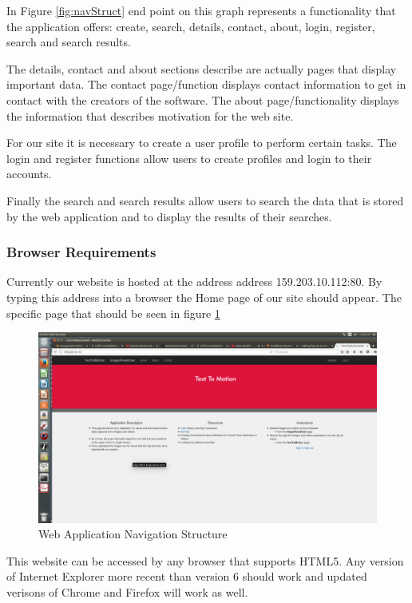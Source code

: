 \documentclass{scrreprt}
\begin{document}
In Figure \ref{fig:navStruct} end point on this graph represents a
functionality that the application offers: create, search, details, contact,
about, login, register, search and search results.

The details, contact and about sections describe are actually pages that
display important data.  The contact page/function displays contact information
to get in contact with the creators of the software.  The about
page/functionality displays the information that describes motivation for the
web site.

For our site it is necessary to create a user profile to perform certain tasks.
The login and register functions allow users to create profiles and login to
their accounts.

Finally the search and search results allow users to search the data that is
stored by the web application and to display the results of their searches.

\subsubsection{Browser Requirements}

Currently our website is hosted at the address address 159.203.10.112:80. By
typing this address into a browser the Home page of our site should appear. The
specific page that should be seen in figure \ref{fig:homePage}

\begin{figure}
  \includegraphics[width=\linewidth]{HomePage.png}
  \caption{Web Application Navigation Structure}
  \label{fig:homePage}
\end{figure}

This website can be accessed by any browser that supports HTML5.  Any
version of Internet Explorer more recent than version 6 should work and updated
verisons of Chrome and Firefox will work as well.
\end{document}

